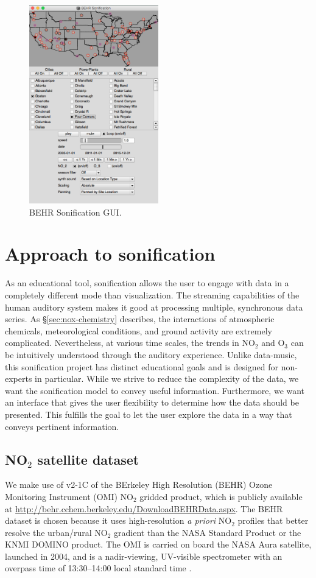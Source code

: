 \documentclass[a4paper,10pt,oneside]{article}
\newcommand{\ce}[1]{$\mathrm{#1}$}
\begin{document}
\begin{sloppy}
\begin{figure}[t]
\centering
\includegraphics[width=0.5\textwidth]{figs/gui_revised.png}
\caption{BEHR Sonification GUI.}
\label{fig:gui}
\end{figure}

\section{Approach to sonification}
As an educational tool, sonification allows the user to engage with data in a completely different mode than visualization. The streaming capabilities of the human auditory system makes it good at processing multiple, synchronous data series. As \S \ref{sec:nox-chemistry} describes, the interactions of atmospheric chemicals, meteorological conditions, and ground activity are extremely complicated. Nevertheless, at various time scales, the trends in \ce{NO_2} and \ce{O_3} can be intuitively understood through the auditory experience. Unlike data-music, this sonification project has distinct educational goals and is designed for non-experts in particular. While we strive to reduce the complexity of the data, we want the sonification model to convey useful information.  Furthermore, we want an interface that gives the user flexibility to determine how the data should be presented.  This fulfills the goal to let the user explore the data in a way that conveys pertinent information.  

\subsection{NO$_2$ satellite dataset}
	We make use of v2-1C of the BErkeley High Resolution (BEHR) Ozone Monitoring Instrument (OMI) \ce{NO_2} gridded product, which is publicly available at \url{http://behr.cchem.berkeley.edu/DownloadBEHRData.aspx}. The BEHR dataset is chosen because it uses high-resolution \emph{a priori} \ce{NO_2} profiles that better resolve the urban/rural \ce{NO_2} gradient than the NASA Standard Product or the KNMI DOMINO product. The OMI is carried on board the NASA Aura satellite, launched in 2004, and is a nadir-viewing, UV-visible spectrometer with an overpass time of 13:30--14:00 local standard time \cite{levelt06}.
	

\end{sloppy}
\end{document}
